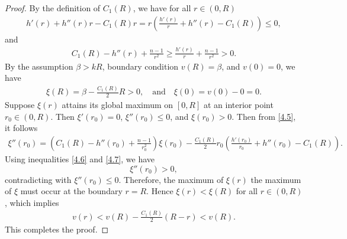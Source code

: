 \documentclass[10pt,a4paper]{amsart}
\begin{document}
\begin{proof}
By the definition of $C_1(R)$, we have for all $r\in (0, R)$
\begin{align}\label{4.6}
h'(r)+h''(r)r-C_1(R)r = r\left(\frac{h'(r)}{r}+h''(r)-C_1(R)\right) \leq 0,
\end{align}
and 
\begin{align}\label{4.7}
 C_1(R) - h''(r) + \frac{n-1}{r^2} \ge \frac{h'(r)}{r} + \frac{n-1}{r^2} > 0.
\end{align}
By the assumption $\beta > kR$,  boundary condition $v(R)=\beta$, and $v(0)=0$, we have
\begin{align*}
   \xi(R) = \beta - \frac {C_1(R)}2R > 0, \quad \text{and}\quad \xi(0) = v(0) - 0 = 0. 
\end{align*}
Suppose $\xi(r)$ attains its global maximum on $[0,R]$ at an interior point $r_{0}\in(0,R)$. Then $\xi'(r_{0})=0$, $\xi''(r_{0})\leq 0$, and $\xi(r_0) > 0$. Then from \eqref{4.5}, it follows 
\begin{align*}
\xi''(r_{0}) = \left(C_{1}(R)-h''(r_0)+\frac{n-1}{r_0^{2}}\right)\xi(r_0) - \frac{C_{1}(R)}{2}r_0\left(\frac{h'(r_0)}{r_0}+h''(r_0)-C_{1}(R)\right).
\end{align*}
Using inequalities \eqref{4.6} and \eqref{4.7}, we have
$$
\xi''(r_0)>0,
$$
contradicting with $\xi''(r_0)\le 0$. Therefore, the maximum of $\xi(r)$
 the maximum of $\xi$ must occur at the boundary $r=R$. Hence $\xi(r) < \xi(R)$ for all $r\in(0,R)$, which implies
\begin{align*}
v(r) < v(R) - \frac{C_{1}(R)}{2}(R-r) < v(R).
\end{align*}
This completes the proof.
\end{proof}
\end{document}
